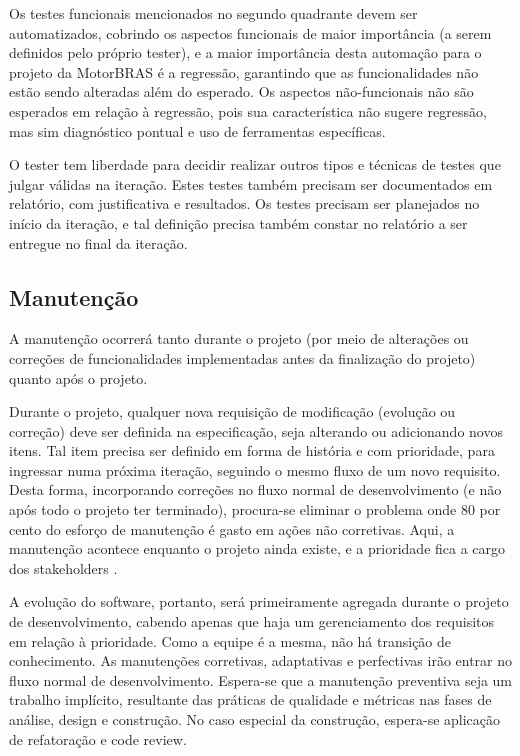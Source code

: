 \documentclass[12pt,journal,compsoc]{IEEEtran}
\begin{document}
Os testes funcionais mencionados no segundo quadrante devem ser automatizados, cobrindo os aspectos funcionais de maior importância (a serem definidos pelo próprio tester), e a maior importância desta automação para o projeto da MotorBRAS é a regressão, garantindo que as funcionalidades não estão sendo alteradas além do esperado. Os aspectos não-funcionais não são esperados em relação à regressão, pois sua característica não sugere regressão, mas sim diagnóstico pontual e uso de ferramentas específicas.

O tester tem liberdade para decidir realizar outros tipos e técnicas de testes que julgar válidas na iteração. Estes testes também precisam ser documentados em relatório, com justificativa e resultados. Os testes precisam ser planejados no início da iteração, e tal definição precisa também constar no relatório a ser entregue no final da iteração.


\subsection{Manutenção}

A manutenção ocorrerá tanto durante o projeto (por meio de alterações ou correções de funcionalidades implementadas antes da finalização do projeto) quanto após o projeto.

Durante o projeto, qualquer nova requisição de modificação (evolução ou correção) deve ser definida na especificação, seja alterando ou adicionando novos itens. Tal item precisa ser definido em forma de história e com prioridade, para ingressar numa próxima iteração, seguindo o mesmo fluxo de um novo requisito. Desta forma, incorporando correções no fluxo normal de desenvolvimento (e não após todo o projeto ter terminado), procura-se eliminar o problema onde 80 por cento do esforço de manutenção é gasto em ações não corretivas. Aqui, a manutenção acontece enquanto o projeto ainda existe, e a prioridade fica a cargo dos stakeholders \cite{schwaber_scrum_2013}. 

A evolução do software, portanto, será primeiramente agregada durante o projeto de desenvolvimento, cabendo apenas que haja um gerenciamento dos requisitos em relação à prioridade. Como a equipe é a mesma, não há transição de conhecimento. As manutenções corretivas, adaptativas e perfectivas irão entrar no fluxo normal de desenvolvimento. Espera-se que a manutenção preventiva seja um trabalho implícito, resultante das práticas de qualidade e métricas nas fases de análise, design e construção. No caso especial da construção, espera-se aplicação de refatoração e code review.
\end{document}

